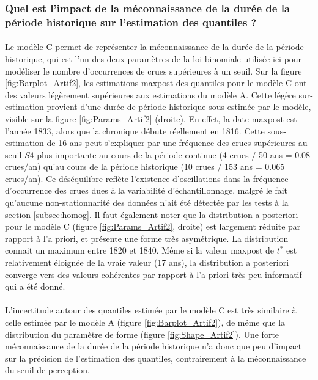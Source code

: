 \documentclass[11pt]{article}
\begin{document}
	\subsubsection{Quel est l'impact de la méconnaissance de la durée de la période historique sur l'estimation des quantiles ?}	
	
	\paragraph{} Le modèle C permet de représenter la méconnaissance de la durée de la période historique, qui est l'un des deux paramètres de la loi binomiale utilisée ici pour modéliser le nombre d'occurrences de crues supérieures à un seuil. Sur la figure \ref{fig:Barplot_Artif2}, les estimations maxpost des quantiles pour le modèle C ont des valeurs légèrement supérieures aux estimations du modèle A. Cette légère sur-estimation provient d'une durée de période historique sous-estimée par le modèle, visible sur la figure \ref{fig:Params_Artif2} (droite). En effet, la date maxpost est l'année 1833, alors que la chronique débute réellement en 1816. Cette sous-estimation de 16 ans peut s'expliquer par une fréquence des crues supérieures au seuil $S4$ plus importante au cours de la période continue (4 crues / 50 ans = 0.08 crues/an) qu'au cours de la période historique (10 crues / 153 ans = 0.065 crues/an). Ce déséquilibre reflète l'existence d'oscillations dans la fréquence d'occurrence des crues dues à la variabilité d'échantillonnage, malgré le fait qu'aucune non-stationnarité des données n'ait été détectée par les tests à la section \ref{subsec:homog}. Il faut également noter que la distribution a posteriori pour le modèle C (figure \ref{fig:Params_Artif2}, droite) est largement réduite par rapport à l'a priori, et présente une forme très asymétrique. La distribution connait un maximum entre 1820 et 1840. Même si la valeur maxpost de $t^*$ est relativement éloignée de la vraie valeur (17 ans), la distribution a posteriori converge vers des valeurs cohérentes par rapport à l'a priori très peu informatif qui a été donné. 	 
	
	\paragraph{} L'incertitude autour des quantiles estimée par le modèle C est très similaire à celle estimée par le modèle A (figure \ref{fig:Barplot_Artif2}), de même que la distribution du paramètre de forme (figure \ref{fig:Shape_Artif2}). Une forte méconnaissance de la durée de la période historique n'a donc que peu d'impact sur la précision de l'estimation des quantiles, contrairement à la méconnaissance du seuil de perception.
	
\end{document}
